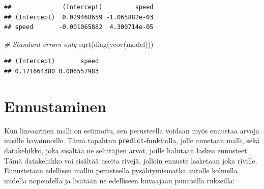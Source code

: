 \documentclass[
]{book}
\newenvironment{Shaded}{\begin{snugshade}}{\end{snugshade}}
\newcommand{\AttributeTok}[1]{\textcolor[rgb]{0.77,0.63,0.00}{#1}}
\newcommand{\CommentTok}[1]{\textcolor[rgb]{0.56,0.35,0.01}{\textit{#1}}}
\newcommand{\DecValTok}[1]{\textcolor[rgb]{0.00,0.00,0.81}{#1}}
\newcommand{\FunctionTok}[1]{\textcolor[rgb]{0.00,0.00,0.00}{#1}}
\newcommand{\NormalTok}[1]{#1}
\newcommand{\OtherTok}[1]{\textcolor[rgb]{0.56,0.35,0.01}{#1}}
\newcommand{\SpecialCharTok}[1]{\textcolor[rgb]{0.00,0.00,0.00}{#1}}
\newcommand{\StringTok}[1]{\textcolor[rgb]{0.31,0.60,0.02}{#1}}
\begin{document}
\begin{verbatim}
##              (Intercept)         speed
## (Intercept)  0.029468659 -1.065882e-03
## speed       -0.001065882  4.300714e-05
\end{verbatim}

\begin{Shaded}
\begin{Highlighting}[]
\CommentTok{\# Standard errors only}
\FunctionTok{sqrt}\NormalTok{(}\FunctionTok{diag}\NormalTok{(}\FunctionTok{vcov}\NormalTok{(model)))}
\end{Highlighting}
\end{Shaded}

\begin{verbatim}
## (Intercept)       speed 
## 0.171664380 0.006557983
\end{verbatim}

\hypertarget{ennustaminen}{%
\section{Ennustaminen}\label{ennustaminen}}

Kun lineaarinen malli on estimoitu, sen perusteella voidaan myös ennustaa arvoja uusille havainnoille. Tämä tapahtuu \texttt{predict}-funktiolla, jolle annetaan malli, sekä datakehikko, joka sisältää ne selittäjien arvot, joille halutaan laskea ennusteet. Tämä datakehikko voi sisältää useita rivejä, jolloin ennuste lasketaan joka riville. Ennustetaan edellisen mallin perusteella pysähtymismatka autolle kolmella uudella nopeudella ja lisätään ne edelliseen kuvaajaan punaisilla rukseilla:

\begin{Shaded}
\end{Shaded}
\end{document}
